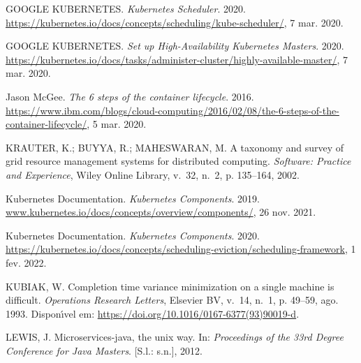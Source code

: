 \documentclass[
	12pt,				%
	openright,			%
	oneside,			%
	a4paper,			%
	brazil				%
	]{abntex2}
\begin{document}
\begin{thebibliography}{}
{{GOOGLE KUBERNETES}. \emph{Kubernetes Scheduler}. 2020.
\url{https://kubernetes.io/docs/concepts/scheduling/kube-scheduler/}, 7 mar.
  2020.}

{{GOOGLE KUBERNETES}. \emph{Set up High-Availability Kubernetes Masters}. 2020.
\url{https://kubernetes.io/docs/tasks/administer-cluster/highly-available-master/},
  7 mar. 2020.}

{{Jason McGee}. \emph{The 6 steps of the container lifecycle}. 2016.
\url{https://www.ibm.com/blogs/cloud-computing/2016/02/08/the-6-steps-of-the-container-lifecycle/},
  5 mar. 2020.}

{KRAUTER, K.; BUYYA, R.; MAHESWARAN, M. A taxonomy and survey of grid resource
  management systems for distributed computing.
\emph{Software: Practice and Experience}, Wiley Online Library, v.~32, n.~2, p.
  135--164, 2002.}

{{Kubernetes Documentation}. \emph{Kubernetes Components}. 2019.
\url{www.kubernetes.io/docs/concepts/overview/components/}, 26 nov. 2021.}

{{Kubernetes Documentation}. \emph{Kubernetes Components}. 2020.
\url{https://kubernetes.io/docs/concepts/scheduling-eviction/scheduling-framework},
  1 fev. 2022.}

{KUBIAK, W. Completion time variance minimization on a single machine is
  difficult.
\emph{Operations Research Letters}, Elsevier {BV}, v.~14, n.~1, p. 49--59, ago.
  1993.
Dispon{\'\i}vel em: \url{https://doi.org/10.1016/0167-6377(93)90019-d}.}

{LEWIS, J. Microservices-java, the unix way. In:  \emph{Proceedings of the 33rd
  Degree Conference for Java Masters}. [S.l.: s.n.], 2012.}


\end{thebibliography}
\end{document}
